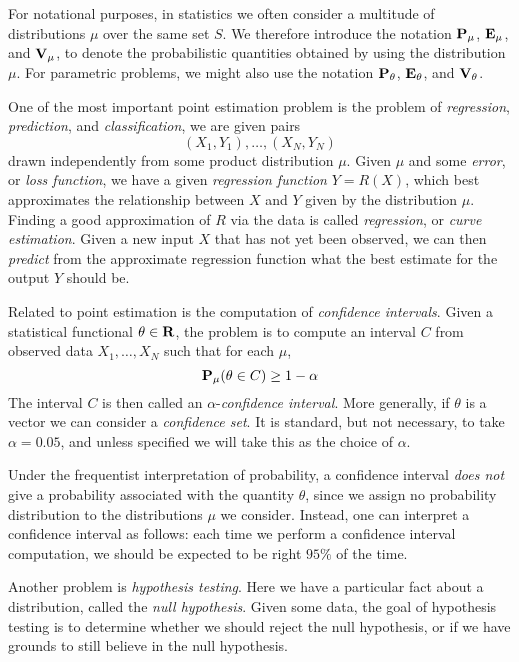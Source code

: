 For notational purposes, in statistics we often consider a multitude of distributions $\mu$ over the same set $S$. We therefore introduce the notation $\operatorname{\mathbf{P}}_\mu$, $\operatorname{\mathbf{E}}_\mu$, and $\operatorname{\mathbf{V}}_\mu$, to denote the probabilistic quantities obtained by using the distribution $\mu$. For parametric problems, we might also use the notation $\operatorname{\mathbf{P}}_\theta$, $\operatorname{\mathbf{E}}_\theta$, and $\operatorname{\mathbf{V}}_\theta$.

One of the most important point estimation problem is the problem of \emph{regression}, \emph{prediction}, and \emph{classification}, we are given pairs
%
\[ (X_1,Y_1),\dots,(X_N,Y_N) \]
%
drawn independently from some product distribution $\mu$. Given $\mu$ and some \emph{error}, or \emph{loss function}, we have a given \emph{regression function} $Y = R(X)$, which best approximates the relationship between $X$ and $Y$ given by the distribution $\mu$. Finding a good approximation of $R$ via the data is called \emph{regression}, or \emph{curve estimation}. Given a new input $X$ that has not yet been observed, we can then \emph{predict} from the approximate regression function what the best estimate for the output $Y$ should be.

Related to point estimation is the computation of \emph{confidence intervals}. Given a statistical functional $\theta \in \operatorname{\mathbf{R}}$, the problem is to compute an interval $C$ from observed data $X_1,\dots,X_N$ such that for each $\mu$,
%
\[ \operatorname{\mathbf{P}}_\mu( \theta \in C ) \geq 1 - \alpha \]
%
The interval $C$ is then called an $\alpha$-\emph{confidence interval}. More generally, if $\theta$ is a vector we can consider a \emph{confidence set}. It is standard, but not necessary, to take $\alpha = 0.05$, and unless specified we will take this as the choice of $\alpha$.

\begin{remark}
	Under the frequentist interpretation of probability, a confidence interval \emph{does not} give a probability associated with the quantity $\theta$, since we assign no probability distribution to the distributions $\mu$ we consider. Instead, one can interpret a confidence interval as follows: each time we perform a confidence interval computation, we should be expected to be right $95\%$ of the time.
\end{remark}

Another problem is \emph{hypothesis testing}. Here we have a particular fact about a distribution, called the \emph{null hypothesis}. Given some data, the goal of hypothesis testing is to determine whether we should reject the null hypothesis, or if we have grounds to still believe in the null hypothesis.

